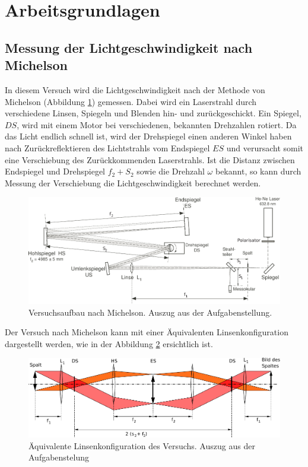 \section{Arbeitsgrundlagen}

\subsection{Messung der Lichtgeschwindigkeit nach Michelson}

In  diesem Versuch wird die Lichtgeschwindigkeit nach der Methode von  Michelson
(Abbildung  \ref{fig:michelson}) gemessen.  Dabei  wird  ein  Laserstrahl  durch
verschiedene  Linsen,  Spiegeln  und  Blenden  hin- und  zur\"uckgeschickt.  Ein
Spiegel, $DS$, wird mit einem  Motor  bei  verschiedenen,  bekannten  Drehzahlen
rotiert.  Da  das Licht endlich schnell ist, wird der Drehspiegel einen  anderen
Winkel haben nach Zur\"uckreflektieren  des Lichtstrahls vom Endspiegel $ES$ und
verursacht somit eine Verschiebung  des  Zur\"uckkommenden Laserstrahls. Ist die
Distanz  zwischen  Endspiegel  und  Drehspiegel $f_2 + S_2$ sowie  die  Drehzahl
$\omega$ bekannt, so kann durch Messung der Verschiebung die
Lichtgeschwindigkeit berechnet werden.

\begin{figure}[H]
    \center
    \includegraphics[width=\textwidth]{images/michelson.pdf}
    \caption{Versuchsaufbau nach Michelson. Auszug aus der Aufgabenstellung.}
    \label{fig:michelson}
\end{figure}

Der  Versuch  nach  Michelson kann mit einer \"Aquivalenten  Linsenkonfiguration
dargestellt werden, wie in der Abbildung \ref{fig:linsenkonfig} ersichtlich ist.

\begin{figure}[H]
    \center
    \includegraphics[width=\textwidth]{images/linsenkonfig.pdf}
    \caption{\"Aquivalente Linsenkonfiguration des Versuchs. Auszug aus der Aufgabenstelung}
    \label{fig:linsenkonfig}
\end{figure}

